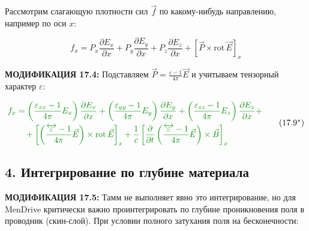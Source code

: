 \documentclass[a4paper,12pt]{article}
\newcommand{\modtext}[1]{\textcolor{modcolor}{#1}}
\newcommand{\modmath}[1]{\textcolor{modcolor}{#1}}
\newcommand{\modblock}[1]{\colorbox{modcolor!10}{\parbox{\dimexpr\linewidth-2\fboxsep}{#1}}}
\begin{document}
\noindent
Рассмотрим слагающую плотности сил $\vec{f}$ по какому-нибудь направлению,
например по оси $x$:

\begin{equation}
f_x = P_x\frac{\partial E_x}{\partial x} +
P_y\frac{\partial E_y}{\partial x} +
P_z\frac{\partial E_z}{\partial x} +
\left[\vec{P} \times \text{rot}\,\vec{E}\right]_x
\tag{17.9}
\end{equation}

\modtext{
    \textbf{МОДИФИКАЦИЯ 17.4:} Подставляем $\vec{P} = \frac{\varepsilon - 1}{4\pi}\vec{E}$
    и учитываем тензорный характер $\varepsilon$:
}

\modblock{
\modtext{
    \begin{equation}
    \modmath{
        \begin{aligned}
        f_x &= \left(\frac{\varepsilon_{xx} - 1}{4\pi}E_x\right)\frac{\partial E_x}{\partial x} +
        \left(\frac{\varepsilon_{yy} - 1}{4\pi}E_y\right)\frac{\partial E_y}{\partial x} +
        \left(\frac{\varepsilon_{zz} - 1}{4\pi}E_z\right)\frac{\partial E_z}{\partial x} + \\
        &\quad + \left[\left(\frac{\overleftrightarrow{\varepsilon} - 1}{4\pi}\vec{E}\right) \times \text{rot}\,\vec{E}\right]_x +
        \frac{1}{c}\left[\frac{\partial}{\partial t}\left(\frac{\overleftrightarrow{\varepsilon} - 1}{4\pi}\vec{E}\right) \times \vec{B}\right]_x
        \end{aligned}
    }
    \tag{17.9$^*$}
    \end{equation}
}
}

\subsection*{4. Интегрирование по глубине материала}

\modtext{
    \textbf{МОДИФИКАЦИЯ 17.5:} Тамм не выполняет явно это интегрирование, но для
    MenDrive критически важно проинтегрировать по глубине проникновения поля в
    проводник (скин-слой). При условии полного затухания поля на бесконечности:
}
\end{document}
